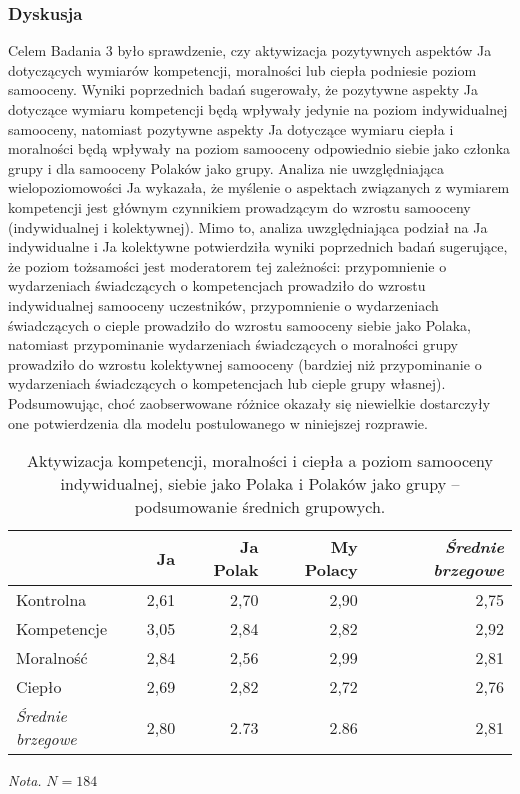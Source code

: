 \documentclass[man]{apa6}
\begin{document}
\subsubsection{Dyskusja}
Celem Badania 3 było sprawdzenie, czy aktywizacja pozytywnych aspektów Ja dotyczących wymiarów kompetencji, moralności lub ciepła podniesie poziom samooceny. Wyniki poprzednich badań sugerowały, że pozytywne aspekty Ja dotyczące wymiaru kompetencji będą wpływały jedynie na poziom indywidualnej samooceny, natomiast pozytywne aspekty Ja dotyczące wymiaru ciepła i moralności będą wpływały na poziom samooceny odpowiednio siebie jako członka grupy i dla samooceny Polaków jako grupy. Analiza nie uwzględniająca wielopoziomowości Ja wykazała, że myślenie o aspektach związanych z wymiarem kompetencji jest głównym czynnikiem prowadzącym do wzrostu samooceny (indywidualnej i kolektywnej). Mimo to, analiza uwzględniająca podział na Ja indywidualne i Ja kolektywne potwierdziła wyniki poprzednich badań sugerujące, że poziom tożsamości jest moderatorem tej zależności: przypomnienie o wydarzeniach świadczących o kompetencjach prowadziło do wzrostu indywidualnej samooceny uczestników, przypomnienie o wydarzeniach świadczących o cieple prowadziło do wzrostu samooceny siebie jako Polaka, natomiast przypominanie wydarzeniach świadczących o moralności grupy prowadziło do wzrostu kolektywnej samooceny (bardziej niż przypominanie o wydarzeniach świadczących o kompetencjach lub cieple grupy własnej). \\

Podsumowując, choć zaobserwowane różnice okazały się niewielkie dostarczyły one potwierdzenia dla modelu postulowanego w niniejszej rozprawie.

\begin{table*}[htbp]
\vspace*{2em}
\centering
\begin{threeparttable}
\caption{Aktywizacja kompetencji, moralności i ciepła a poziom samooceny indywidualnej, siebie jako Polaka i Polaków jako grupy -- podsumowanie średnich grupowych.}
\label{tab:3}
\bgroup
\def\arraystretch{0.85}
\begin{tabular}{lrrrr}
\midrule
                        & Ja        & Ja Polak  & My Polacy & \emph{Średnie brzegowe}\\
\midrule
Kontrolna               & 2,61      & 2,70      & 2,90      & 2,75 \\
Kompetencje             & 3,05      & 2,84      & 2,82      & 2,92 \\
Moralność               & 2,84      & 2,56      & 2,99      & 2,81 \\
Ciepło                  & 2,69      & 2,82      & 2,72      & 2,76 \\

\emph{Średnie brzegowe} & 2,80      & 2.73      & 2.86      & 2,81 \\

\bottomrule
\end{tabular}
\egroup
\begin{tablenotes}
{\small
\textit{Nota.} $N = 184$
}
\end{tablenotes}
\end{threeparttable}
\end{table*}
\end{document}
